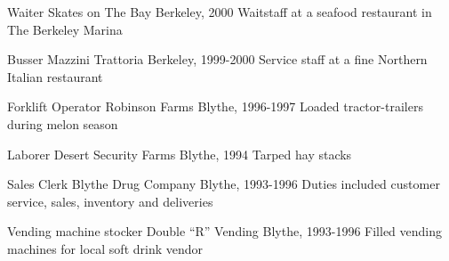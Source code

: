 
	\begin{cventries}

		\cventry
			{Waiter}
			{Skates on The Bay}
			{Berkeley, }
			{2000}
			{Waitstaff at a seafood restaurant in The Berkeley Marina}

		\cventry
			{Busser}
			{Mazzini Trattoria}
			{Berkeley, }
			{1999-2000}
			{Service staff at a fine Northern Italian restaurant}

		\cventry
			{Forklift Operator}
			{Robinson Farms}
			{Blythe, }
			{1996-1997}
			{Loaded tractor-trailers during melon season}

		\cventry
			{Laborer}
			{Desert Security Farms}
			{Blythe, }
			{1994}
			{Tarped hay stacks}

	   	\cventry
    		{Sales Clerk}
    		{Blythe Drug Company}
    		{Blythe, }
	    	{1993-1996}
    		{Duties included customer service, sales, inventory and deliveries}

    	\cventry
    		{Vending machine stocker}
    		{Double ``R'' Vending}
    		{Blythe, }
	    	{1993-1996}
    		{Filled vending machines for local soft drink vendor}

	\end{cventries}